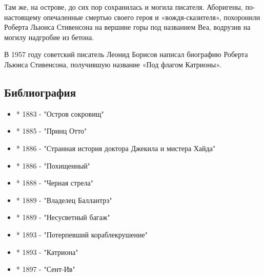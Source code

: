 Там же, на острове, до сих пор сохранилась и могила писателя. Аборигены,
по-настоящему опечаленные смертью своего героя и «вождя-сказителя»,
похоронили Роберта Льюиса Стивенсона на вершине горы под названием Веа,
водрузив на могилу надгробие из бетона.

В 1957 году советский писатель Леонид Борисов написал биографию Роберта
Льюиса Стивенсона, получившую название «Под флагом Катрионы».

\subsection{Библиография}

\begin{itemize}
	\item * 1883 - "Остров сокровищ"
	\item * 1885 - "Принц Отто"
	\item * 1886 - "Странная история доктора Джекила и мистера Хайда"
	\item * 1886 - "Похищенный"
	\item * 1888 - "Черная стрела"
	\item * 1889 - "Владелец Баллантрэ"
	\item * 1889 - "Несусветный багаж"
	\item * 1893 - "Потерпевший кораблекрушение"
	\item * 1893 - "Катриона"
	\item * 1897 - "Сент-Ив"
\end{itemize}

